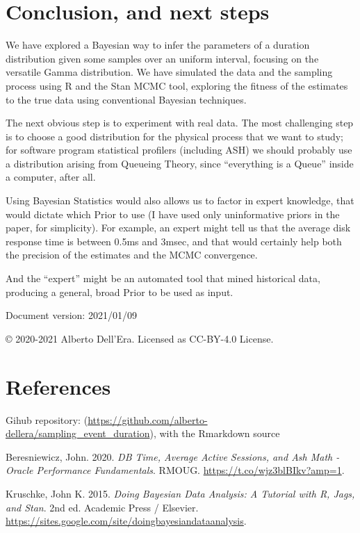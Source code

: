 \documentclass[]{article}
\begin{document}
\hypertarget{conclusion-and-next-steps}{%
\section{Conclusion, and next steps}\label{conclusion-and-next-steps}}

We have explored a Bayesian way to infer the parameters of a duration
distribution given some samples over an uniform interval, focusing on
the versatile Gamma distribution. We have simulated the data and the
sampling process using R and the Stan MCMC tool, exploring the fitness
of the estimates to the true data using conventional Bayesian
techniques.

The next obvious step is to experiment with real data. The most
challenging step is to choose a good distribution for the physical
process that we want to study; for software program statistical
profilers (including ASH) we should probably use a distribution arising
from Queueing Theory, since ``everything is a Queue'' inside a computer,
after all.

Using Bayesian Statistics would also allows us to factor in expert
knowledge, that would dictate which Prior to use (I have used only
uninformative priors in the paper, for simplicity). For example, an
expert might tell us that the average disk response time is between
0.5ms and 3msec, and that would certainly help both the precision of the
estimates and the MCMC convergence.

And the ``expert'' might be an automated tool that mined historical
data, producing a general, broad Prior to be used as input.

Document version: 2021/01/09

© 2020-2021 Alberto Dell'Era. Licensed as CC-BY-4.0 License.

\hypertarget{references}{%
\section{References}\label{references}}

Gihub repository:
(\url{https://github.com/alberto-dellera/sampling_event_duration}), with
the Rmarkdown source

\hypertarget{refs}{}
\leavevmode\hypertarget{ref-ASHMATH}{}%
Beresniewicz, John. 2020. \emph{DB Time, Average Active Sessions, and
Ash Math - Oracle Performance Fundamentals}. RMOUG.
\url{https://t.co/wjz3blBIkv?amp=1}.

\leavevmode\hypertarget{ref-DBDA2E}{}%
Kruschke, John K. 2015. \emph{Doing Bayesian Data Analysis: A Tutorial
with R, Jags, and Stan}. 2nd ed. Academic Press / Elsevier.
\url{https://sites.google.com/site/doingbayesiandataanalysis}.
\end{document}

